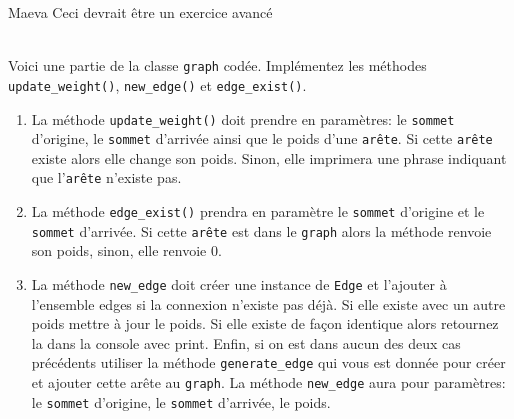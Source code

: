 \begin{note}{Maeva}
    Ceci devrait être un exercice avancé
\end{note}
\begin{Exercice}[20 minutes]\\

Voici une partie de la classe \lstinline{graph} codée. Implémentez les méthodes \lstinline{update_weight()}, \lstinline{new_edge()} et \lstinline{edge_exist()}.

         
    \begin{enumerate}
        \item La méthode \lstinline{update_weight()} doit prendre en paramètres: le \lstinline{sommet} d'origine, le \lstinline{sommet} d'arrivée ainsi que le poids d'une \lstinline{arête}. Si cette \lstinline{arête} existe alors elle change son poids. Sinon, elle imprimera une phrase indiquant que l'\lstinline{arête} n'existe pas.
        \item La méthode \lstinline{edge_exist()} prendra en paramètre le \lstinline{sommet} d'origine et le \lstinline{sommet} d'arrivée. Si cette \lstinline{arête} est dans le \lstinline{graph} alors la méthode renvoie son poids, sinon, elle renvoie 0.
        \item La méthode \lstinline{new_edge} doit créer une instance de \lstinline{Edge} et l'ajouter à l'ensemble edges si la connexion n'existe pas déjà. Si elle existe avec un autre poids mettre à jour le poids. Si elle existe de façon identique alors retournez la dans la console avec print. Enfin, si on est dans aucun des deux cas précédents utiliser la méthode \lstinline{generate_edge} qui vous est donnée pour créer et ajouter cette arête au \lstinline{graph}. La méthode \lstinline{new_edge} aura pour paramètres: le \lstinline{sommet} d'origine, le \lstinline{sommet} d'arrivée, le poids.
    \end{enumerate}


\end{Exercice}
